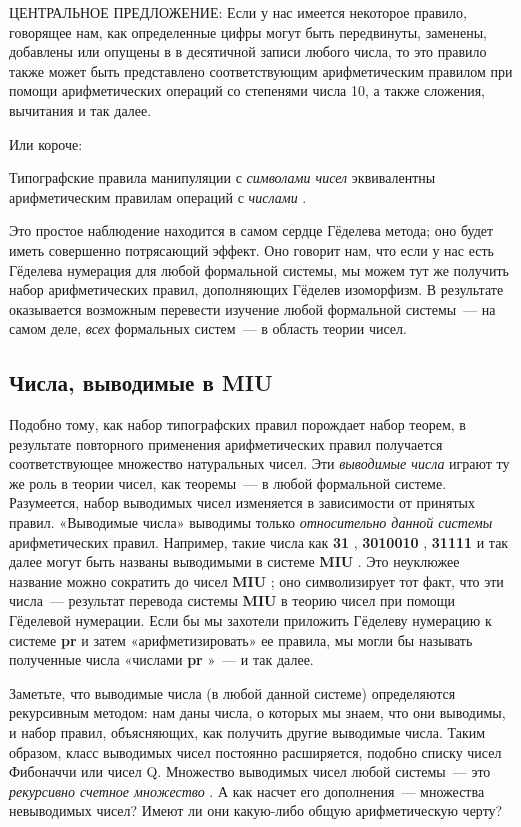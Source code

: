 \documentclass[../main.tex]{subfiles}
\begin{document}
ЦЕНТРАЛЬНОЕ ПРЕДЛОЖЕНИЕ: Если у нас имеется некоторое правило, говорящее нам, как определенные цифры могут быть передвинуты, заменены, добавлены или опущены в в десятичной записи любого числа, то это правило также может быть представлено соответствующим арифметическим правилом при помощи арифметических операций со степенями числа 10, а также сложения, вычитания и так далее.

Или короче:

Типографские правила манипуляции с \emph{символами чисел} эквивалентны арифметическим правилам операций с \emph{числами} .

Это простое наблюдение находится в самом сердце Гёделева метода; оно будет иметь совершенно потрясающий эффект. Оно говорит нам, что если у нас есть Гёделева нумерация для любой формальной системы, мы можем тут же получить набор арифметических правил, дополняющих Гёделев изоморфизм. В результате оказывается возможным перевести изучение любой формальной системы~--- на самом деле, \emph{всех} формальных систем~--- в область теории чисел.


\subsection{Числа, выводимые в MIU}

Подобно тому, как набор типографских правил порождает набор теорем, в результате повторного применения арифметических правил получается соответствующее множество натуральных чисел. Эти \emph{выводимые числа} играют ту же роль в теории чисел, как теоремы~--- в любой формальной системе. Разумеется, набор выводимых чисел изменяется в зависимости от принятых правил. «Выводимые числа» выводимы только \emph{относительно данной системы} арифметических правил. Например, такие числа как \textbf{31} , \textbf{3010010} , \textbf{31111} и так далее могут быть названы выводимыми в системе \textbf{MIU} . Это неуклюжее название можно сократить до чисел \textbf{MIU} ; оно символизирует тот факт, что эти числа~--- результат перевода системы \textbf{MIU} в теорию чисел при помощи Гёделевой нумерации. Если бы мы захотели приложить Гёделеву нумерацию к системе \textbf{pr} и затем «арифметизировать» ее правила, мы могли бы называть полученные числа «числами \textbf{pr} »~--- и так далее.

Заметьте, что выводимые числа (в любой данной системе) определяются рекурсивным методом: нам даны числа, о которых мы знаем, что они выводимы, и набор правил, объясняющих, как получить другие выводимые числа. Таким образом, класс выводимых чисел постоянно расширяется, подобно списку чисел Фибоначчи или чисел Q. Множество выводимых чисел любой системы~--- это \emph{рекурсивно счетное множество} . А как насчет его дополнения~--- множества невыводимых чисел? Имеют ли они какую-либо общую арифметическую черту?
\end{document}
